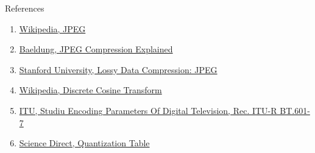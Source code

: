 \documentclass[10pt]{beamer}
\begin{document}
\begin{frame}{References}
    \footnotesize
    \begin{enumerate}
     \item \href{https://en.wikipedia.org/wiki/JPEG}{Wikipedia, JPEG}
     \item \href{https://www.baeldung.com/cs/jpeg-compression}{Baeldung, JPEG Compression Explained}
     \item \href{https://cs.stanford.edu/people/eroberts/courses/soco/projects/data-compression/lossy/jpeg/index.htm}{Stanford University, Lossy Data Compression: JPEG}
     \item \href{https://en.wikipedia.org/wiki/Discrete_cosine_transform}{Wikipedia, Discrete Cosine Transform}
     \item \href{https://www.itu.int/dms_pubrec/itu-r/rec/bt/R-REC-BT.601-7-201103-I!!PDF-E.pdf}{ITU, Studiu Encoding Parameters Of Digital Television, Rec. ITU-R BT.601-7}
     \item \href{https://www.sciencedirect.com/topics/engineering/quantization-table}{Science Direct, Quantization Table}
    \end{enumerate}

\end{frame}
\end{document}
